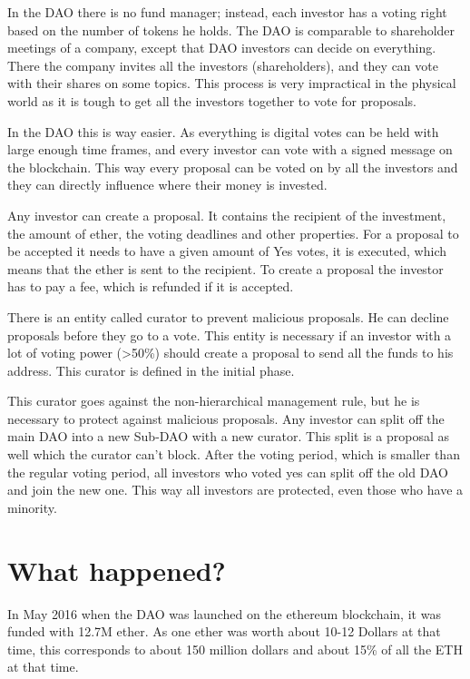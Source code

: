 \documentclass[a4paper, 11pt]{scrartcl}
\begin{document}
In the DAO there is no fund manager; instead, each investor has a voting right based on the number of tokens he holds. The DAO is comparable to shareholder meetings of a company, except that DAO investors can decide on everything. There the company invites all the investors (shareholders), and they can vote with their shares on some topics. This process is very impractical in the physical world as it is tough to get all the investors together to vote for proposals. 

In the DAO this is way easier. As everything is digital votes can be held with large enough time frames, and every investor can vote with a signed message on the blockchain. This way every proposal can be voted on by all the investors and they can directly influence where their money is invested. 

Any investor can create a proposal. It contains the recipient of the investment, the amount of ether, the voting deadlines and other properties. For a proposal to be accepted it needs to have a given amount of Yes votes, it is executed, which means that the ether is sent to the recipient. To create a proposal the investor has to pay a fee, which is refunded if it is accepted. 

There is an entity called curator to prevent malicious proposals. He can decline proposals before they go to a vote. This entity is necessary if an investor with a lot of voting power (>50\%) should create a proposal to send all the funds to his address. This curator is defined in the initial phase.

This curator goes against the non-hierarchical management rule, but he is necessary to protect against malicious proposals. Any investor can split off the main DAO into a new Sub-DAO with a new curator. This split is a proposal as well which the curator can't block. After the voting period, which is smaller than the regular voting period, all investors who voted yes can split off the old DAO and join the new one. This way all investors are protected, even those who have a minority.

\section{What happened?}

In May 2016 when the DAO was launched on the ethereum blockchain, it was funded with 12.7M ether.
As one ether was worth about 10-12 Dollars at that time, this corresponds to about 150 million dollars and about 15\% of all the ETH at that time.\cite{understandingDAO}
\end{document}
